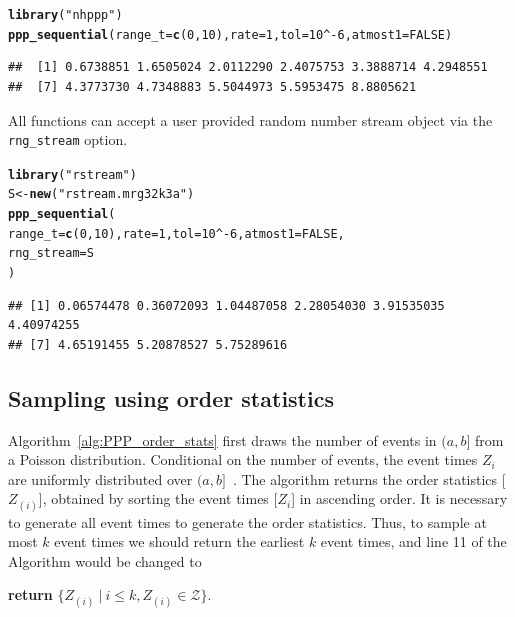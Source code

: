 \documentclass[article,nojss]{jss}\usepackage[]{graphicx}\usepackage[]{xcolor}
\makeatletter
\newcommand{\hlnum}[1]{\textcolor[rgb]{0.686,0.059,0.569}{#1}}%
\newcommand{\hlstr}[1]{\textcolor[rgb]{0.192,0.494,0.8}{#1}}%
\newcommand{\hlopt}[1]{\textcolor[rgb]{0,0,0}{#1}}%
\newcommand{\hlstd}[1]{\textcolor[rgb]{0.345,0.345,0.345}{#1}}%
\newcommand{\hlkwb}[1]{\textcolor[rgb]{0.69,0.353,0.396}{#1}}%
\newcommand{\hlkwc}[1]{\textcolor[rgb]{0.333,0.667,0.333}{#1}}%
\newcommand{\hlkwd}[1]{\textcolor[rgb]{0.737,0.353,0.396}{\textbf{#1}}}%
\newenvironment{kframe}{%
 \def\at@end@of@kframe{}%
 \ifinner\ifhmode%
  \def\at@end@of@kframe{\end{minipage}}%
  \begin{minipage}{\columnwidth}%
 \fi\fi%
 \def\FrameCommand##1{\hskip\@totalleftmargin \hskip-\fboxsep
 \colorbox{shadecolor}{##1}\hskip-\fboxsep
     \hskip-\linewidth \hskip-\@totalleftmargin \hskip\columnwidth}%
 \MakeFramed {\advance\hsize-\width
   \@totalleftmargin\z@ \linewidth\hsize
   \@setminipage}}%
 {\par\unskip\endMakeFramed%
 \at@end@of@kframe}
\newenvironment{knitrout}{}{} %
\makeatother
\begin{document}
\begin{knitrout}
\color{fgcolor}\begin{kframe}
\begin{alltt}
\hlkwd{library}\hlstd{(}\hlstr{"nhppp"}\hlstd{)}
\hlkwd{ppp_sequential}\hlstd{(}\hlkwc{range_t} \hlstd{=} \hlkwd{c}\hlstd{(}\hlnum{0}\hlstd{,} \hlnum{10}\hlstd{),} \hlkwc{rate} \hlstd{=} \hlnum{1}\hlstd{,} \hlkwc{tol} \hlstd{=} \hlnum{10}\hlopt{^-}\hlnum{6}\hlstd{,} \hlkwc{atmost1} \hlstd{=} \hlnum{FALSE}\hlstd{)}
\end{alltt}
\begin{verbatim}
##  [1] 0.6738851 1.6505024 2.0112290 2.4075753 3.3888714 4.2948551
##  [7] 4.3773730 4.7348883 5.5044973 5.5953475 8.8805621
\end{verbatim}
\end{kframe}
\end{knitrout}

All  functions can accept a user provided random number stream object via the \texttt{rng\_stream} option.

\begin{knitrout}
\color{fgcolor}\begin{kframe}
\begin{alltt}
\hlkwd{library}\hlstd{(}\hlstr{"rstream"}\hlstd{)}
\hlstd{S} \hlkwb{<-} \hlkwd{new}\hlstd{(}\hlstr{"rstream.mrg32k3a"}\hlstd{)}
\hlkwd{ppp_sequential}\hlstd{(}
  \hlkwc{range_t} \hlstd{=} \hlkwd{c}\hlstd{(}\hlnum{0}\hlstd{,} \hlnum{10}\hlstd{),} \hlkwc{rate} \hlstd{=} \hlnum{1}\hlstd{,} \hlkwc{tol} \hlstd{=} \hlnum{10}\hlopt{^-}\hlnum{6}\hlstd{,} \hlkwc{atmost1} \hlstd{=} \hlnum{FALSE}\hlstd{,}
  \hlkwc{rng_stream} \hlstd{= S}
\hlstd{)}
\end{alltt}
\begin{verbatim}
## [1] 0.06574478 0.36072093 1.04487058 2.28054030 3.91535035 4.40974255
## [7] 4.65191455 5.20878527 5.75289616
\end{verbatim}
\end{kframe}
\end{knitrout}


\subsection{Sampling using order statistics}\label{sec:PPP_order_stats}


Algorithm~\ref{alg:PPP_order_stats} first draws the number of events in $(a, b]$ from a Poisson distribution. Conditional on the number of events, the event times $Z_i$ are uniformly distributed over $(a, b]$~\citep[par. 4.1]{cox1965theory}. The algorithm returns the order statistics [$Z_{(i)}$], obtained by sorting the event times [$Z_i$] in ascending order. It is necessary to generate all event times to generate the order statistics. Thus, to sample at most $k$ event times we should return the earliest $k$ event times, and line 11 of the Algorithm would be changed to
\begin{center}
\textbf{return} {$\{Z_{(i)} \ | \ i \le k, Z_{(i)} \in \mathcal{Z}\}$}.
\end{center}
\end{document}

